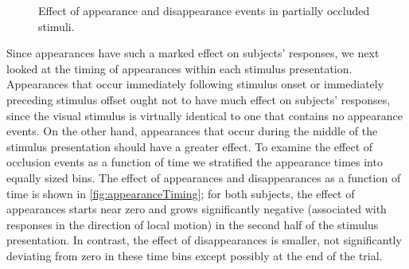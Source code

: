 \documentclass[../manuscript]{subfiles}
\begin{document}
\begin{figure}
\begin{subfigure}[b]{.45\linewidth}
		\label{fig:appearanceTiming}
	\end{subfigure}
	\caption{Effect of appearance and disappearance events in partially occluded stimuli.}\label{fig:appearances}
\end{figure}

Since appearances have such a marked effect on subjects' responses, we next looked at the timing of appearances within each stimulus presentation. Appearances that occur immediately following stimulus onset or immediately preceding stimulus offset ought not to have much effect on subjects' responses, since the visual stimulus is virtually identical to one that contains no appearance events. On the other hand, appearances that occur during the middle of the stimulus presentation should have a greater effect. To examine the effect of occlusion events as a function of time we stratified the appearance times into equally sized bins. The effect of appearances and disappearances as a function of time is shown in \autoref{fig:appearanceTiming}; for both subjects, the effect of appearances starts near zero and grows significantly negative (associated with responses in the direction of local motion) in the second half of the stimulus presentation. In contrast, the effect of disappearances is smaller, not significantly deviating from zero in these time bins except possibly at the end of the trial.


\end{document}
